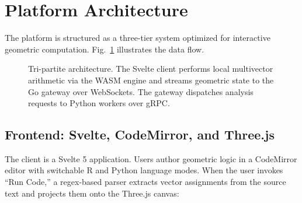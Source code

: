 \documentclass[conference]{IEEEtran}
\begin{document}
\section{Platform Architecture}
\label{sec:arch}

The platform is structured as a three-tier system optimized for interactive geometric computation. Fig.~\ref{fig:architecture} illustrates the data flow.

\begin{figure}[htbp]
\centering
{}
\caption{Tri-partite architecture. The Svelte client performs local multivector arithmetic via the WASM engine and streams geometric state to the Go gateway over WebSockets. The gateway dispatches analysis requests to Python workers over gRPC.}
\label{fig:architecture}
\end{figure}

\subsection{Frontend: Svelte, CodeMirror, and Three.js}
The client is a Svelte 5 application. Users author geometric logic in a CodeMirror editor with switchable R and Python language modes. When the user invokes ``Run Code,'' a regex-based parser extracts vector assignments from the source text and projects them onto the Three.js canvas:
\end{document}
